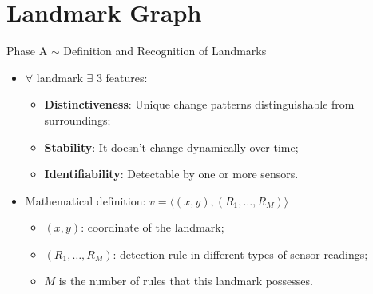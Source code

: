 \section[L. Graph]{Landmark Graph}
\begin{frame}{Phase A $\sim$ Definition and Recognition of Landmarks}
    \begin{itemize}
        \item $\forall$ landmark $\exists$ 3 features:
            \begin{itemize}
                \item \textbf{Distinctiveness}: Unique change patterns distinguishable from surroundings;
                \item \textbf{Stability}: It doesn't change dynamically over time;
                \item \textbf{Identifiability}: Detectable by one or more sensors.
            \end{itemize}
        \item Mathematical definition: \( v = \langle (x, y), (R_1, \ldots, R_M) \rangle \)
            \begin{itemize}
                  \item $(x, y)$: coordinate of the landmark;
                  \item $(R_1, \dots ,R_M)$: detection rule in different types of sensor readings;
                  \item $M$ is the number of rules that this landmark possesses.
            \end{itemize}
    \end{itemize}
\end{frame}


